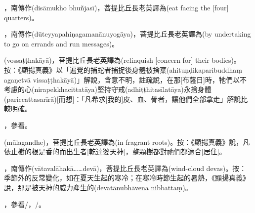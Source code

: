 \startitemgroup[noteitems]
\item{}，南傳作(disāmukho bhuñjasī)，菩提比丘長老英譯為(eat facing the [four] quarters)。
\stopitemgroup

\startitemgroup[noteitems]
\item{}，南傳作(dūteyyapahiṇagamanānuyogāya)，菩提比丘長老英譯為(by undertaking to go on errands and run messages)。
\stopitemgroup

\startitemgroup[noteitems]
\item{}(vossaṭṭhakāyā)，菩提比丘長老英譯為(relinquish [concern for] their bodies)。按：《顯揚真義》以「遍覺的捕蛇者捕捉後身體被捨棄(ahituṇḍikaparibuddhaṃ agaṇetvā vissaṭṭhakāyā)」解說，含意不明，註疏說，在那[布薩日]時，牠們以不考慮的心(nirapekkhacittatāya)堅持守戒(adhiṭṭhitasīlatāya)永捨身體(pariccattasarīrā)[而想]：「凡希求[我的]皮、血、骨者，讓他們全部拿走」解說比較明確。
\stopitemgroup

\startitemgroup[noteitems]
\item{}，參看。
\stopitemgroup

\startitemgroup[noteitems]
\item{}(mūlagandhe)，菩提比丘長老英譯為(in fragrant roots)。按：《顯揚真義》說，凡依止樹的根是香的而出生者[乾達婆天神]，整顆樹都對祂們都適合[居住]。
\stopitemgroup

\startitemgroup[noteitems]
\item{}，南傳作(vātavalāhakā……devā)，菩提比丘長老英譯為(wind-cloud devas)。按：季節外的反常變化，如在夏天生起的寒冷；在寒冷時節生起的暑熱，《顯揚真義》說，那是被天神的威力產生的(devatānubhāvena nibbattaṃ)。
\stopitemgroup

\startitemgroup[noteitems]
\item{}，參看/，/。
\stopitemgroup

